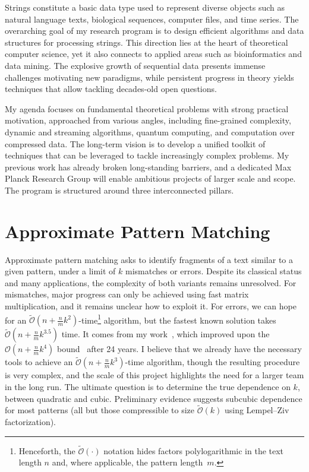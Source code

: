 \documentclass[a4paper,11pt]{article}
\newcommand{\Oh}{\mathcal{O}}
\newcommand{\Ohtilde}{\tilde{\mathcal{O}}}
\begin{document}
\thispagestyle{firststyle}

Strings constitute a basic data type used to represent diverse objects such as natural language texts, biological sequences, computer files, and time series. 
The overarching goal of my research program is to design efficient algorithms and data structures for processing strings. 
This direction lies at the heart of theoretical computer science, yet it also connects to applied areas such as bioinformatics and data mining. 
The explosive growth of sequential data presents immense challenges motivating new paradigms, while persistent progress in theory yields techniques that allow tackling decades-old open questions.

My agenda focuses on fundamental theoretical problems with strong practical motivation, approached from various angles, including fine-grained complexity, dynamic and streaming algorithms, quantum computing, and computation over compressed data. 
The long-term vision is to develop a unified toolkit of techniques that can be leveraged to tackle increasingly complex problems. 
My previous work has already broken long-standing barriers, and a dedicated Max Planck Research Group will enable ambitious projects of larger scale and scope. 
The program is structured around three interconnected pillars.

\section{Approximate Pattern Matching}

Approximate pattern matching asks to identify fragments of a text similar to a given pattern, under a limit of $k$ mismatches or errors. 
Despite its classical status and many applications, the complexity of both variants remains unresolved. 
For mismatches, major progress can only be achieved using fast matrix multiplication, and it remains unclear how to exploit it. 
For errors, we can hope for an $\Ohtilde(n+\tfrac{n}{m}k^{2})$-time\footnote{Henceforth, the $\Ohtilde(\cdot)$ notation hides factors polylogarithmic in the text length $n$ and, where applicable, the pattern length~$m$.} algorithm, but the fastest known solution takes $\Ohtilde(n+\tfrac{n}{m}k^{3.5})$ time. 
It comes from my work~\cite{CKW22}, which improved upon the $\Oh(n+\tfrac{n}{m}k^4)$ bound~\cite{CH98} after 24 years.  
I believe that we already have the necessary tools to achieve an $\Ohtilde(n+\tfrac{n}{m}k^{3})$-time algorithm, though the resulting procedure is very complex, and the scale of this project highlights the need for a larger team in the long run.
The ultimate question is to determine the true dependence on $k$, between quadratic and cubic. 
Preliminary evidence suggests subcubic dependence for most patterns (all but those compressible to size $\Ohtilde(k)$ using Lempel--Ziv factorization).  
\end{document}
